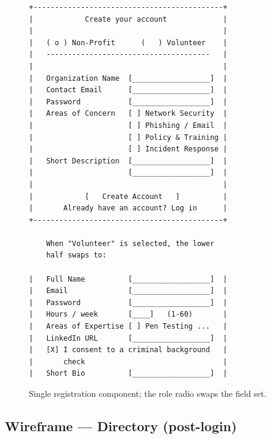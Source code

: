 \documentclass[11pt,letterpaper]{article}
\begin{document}
\begin{figure}[H]
\centering
\begin{BVerbatim}[fontsize=\footnotesize]
+--------------------------------------------+
|            Create your account             |
|                                            |
|   ( o ) Non-Profit      (   ) Volunteer    |
|   --------------------------------------   |
|                                            |
|   Organization Name  [__________________]  |
|   Contact Email      [__________________]  |
|   Password           [__________________]  |
|   Areas of Concern   [ ] Network Security  |
|                      [ ] Phishing / Email  |
|                      [ ] Policy & Training |
|                      [ ] Incident Response |
|   Short Description  [__________________]  |
|                      [__________________]  |
|                                            |
|            [   Create Account   ]          |
|       Already have an account? Log in      |
+--------------------------------------------+

    When "Volunteer" is selected, the lower
    half swaps to:

|   Full Name          [__________________]  |
|   Email              [__________________]  |
|   Password           [__________________]  |
|   Hours / week       [____]   (1-60)       |
|   Areas of Expertise [ ] Pen Testing ...   |
|   LinkedIn URL       [__________________]  |
|   [X] I consent to a criminal background   |
|       check                                |
|   Short Bio          [__________________]  |
\end{BVerbatim}
\caption{Single registration component; the role radio swaps the field set.}
\end{figure}

\subsection{Wireframe --- Directory (post-login)}
\end{document}

